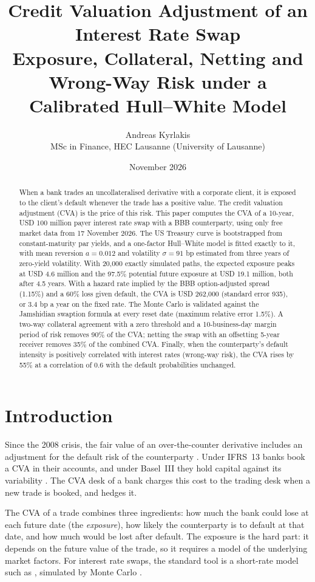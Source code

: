 \documentclass[11pt,a4paper]{article}
\title{Credit Valuation Adjustment of an Interest Rate Swap\\
\large Exposure, Collateral, Netting and Wrong-Way Risk under a Calibrated Hull--White Model}
\author{Andreas Kyrlakis\\
\small MSc in Finance, HEC Lausanne (University of Lausanne)}
\date{November 2026}
\begin{document}
\maketitle

\begin{abstract}
\noindent
When a bank trades an uncollateralised derivative with a corporate client, it is exposed to the client's default whenever the trade has a positive value. The credit valuation adjustment (CVA) is the price of this risk. This paper computes the CVA of a 10-year, USD 100 million payer interest rate swap with a BBB counterparty, using only free market data from 17 November 2026. The US Treasury curve is bootstrapped from constant-maturity par yields, and a one-factor Hull--White model is fitted exactly to it, with mean reversion $a=0.012$ and volatility $\sigma=91$ bp estimated from three years of zero-yield volatility. With 20{,}000 exactly simulated paths, the expected exposure peaks at USD 4.6 million and the 97.5\% potential future exposure at USD 19.1 million, both after 4.5 years. With a hazard rate implied by the BBB option-adjusted spread (1.15\%) and a 60\% loss given default, the CVA is USD 262{,}000 (standard error 935), or 3.4 bp a year on the fixed rate. The Monte Carlo is validated against the Jamshidian swaption formula at every reset date (maximum relative error 1.5\%). A two-way collateral agreement with a zero threshold and a 10-business-day margin period of risk removes 90\% of the CVA; netting the swap with an offsetting 5-year receiver removes 35\% of the combined CVA. Finally, when the counterparty's default intensity is positively correlated with interest rates (wrong-way risk), the CVA rises by 55\% at a correlation of 0.6 with the default probabilities unchanged.
\end{abstract}

\section{Introduction}

Since the 2008 crisis, the fair value of an over-the-counter derivative includes an adjustment for the default risk of the counterparty \citep{gregory2020}. Under IFRS~13 banks book a CVA in their accounts, and under Basel~III they hold capital against its variability \citep{basel2017}. The CVA desk of a bank charges this cost to the trading desk when a new trade is booked, and hedges it.

The CVA of a trade combines three ingredients: how much the bank could lose at each future date (the \emph{exposure}), how likely the counterparty is to default at that date, and how much would be lost after default. The exposure is the hard part: it depends on the future value of the trade, so it requires a model of the underlying market factors. For interest rate swaps, the standard tool is a short-rate model such as \citet{hullwhite1990}, simulated by Monte Carlo \citep{pykhtin2007,brigo2013}.
\end{document}
